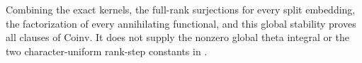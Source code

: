 Combining the exact kernels, the full-rank surjections for
every split embedding, the factorization of every
annihilating functional, and this global stability proves
all clauses of \(\mathrm{Coinv}\).
It does not supply the nonzero global theta integral or the
two character-uniform rank-step constants in
.
